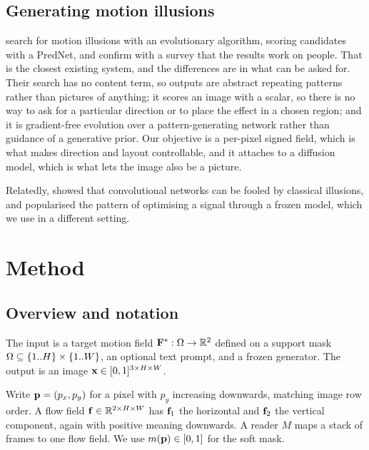 \subsection{Generating motion illusions}

\citet{sinapayen2021eigen} search for motion illusions with an evolutionary
algorithm, scoring candidates with a PredNet, and confirm with a survey that
the results work on people. That is the closest existing system, and the
differences are in what can be asked for. Their search has no content term, so
outputs are abstract repeating patterns rather than pictures of anything; it
scores an image with a scalar, so there is no way to ask for a particular
direction or to place the effect in a chosen region; and it is gradient-free
evolution over a pattern-generating network rather than guidance of a
generative prior. Our objective is a per-pixel signed field, which is what
makes direction and layout controllable, and it attaches to a diffusion model,
which is what lets the image also be a picture.

Relatedly, \citet{gomezvilla2019deceived} showed that convolutional networks
can be fooled by classical illusions, and \citet{poole2023dreamfusion}
popularised the pattern of optimising a signal through a frozen model, which we
use in a different setting.

\section{Method}

\subsection{Overview and notation}

The input is a target motion field $\mathbf{F}^\ast:\Omega\to\mathbb{R}^2$ defined on a support
mask $\Omega\subseteq\{1..H\}\times\{1..W\}$, an optional text prompt, and a frozen
generator. The output is an image $\mathbf{x}\in[0,1]^{3\times H\times W}$.

Write $\mathbf{p}=(p_x,p_y)$ for a pixel with $p_y$ increasing downwards, matching
image row order. A flow field $\mathbf{f}\in\mathbb{R}^{2\times H\times W}$ has $\mathbf{f}_1$ the
horizontal and $\mathbf{f}_2$ the vertical component, again with positive meaning
downwards. A reader $M$ maps a stack of frames to one flow field. We use
$m(\mathbf{p})\in[0,1]$ for the soft mask.

